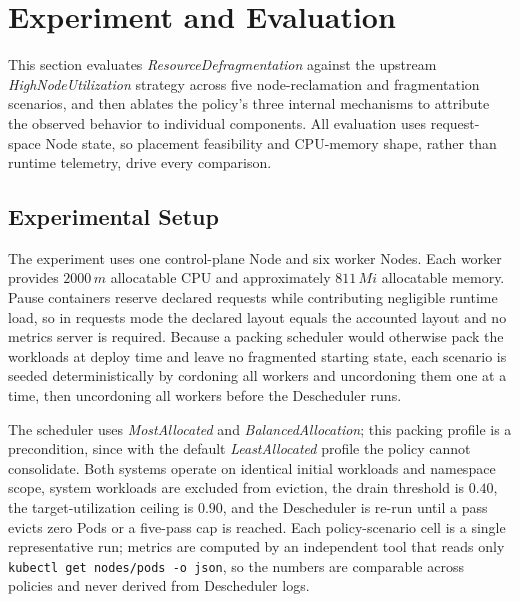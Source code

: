 \section{Experiment and Evaluation}
\label{bab:4}

This section evaluates \textit{ResourceDefragmentation} against the upstream \textit{HighNodeUtilization} strategy across five node-reclamation and fragmentation scenarios, and then ablates the policy's three internal mechanisms to attribute the observed behavior to individual components. All evaluation uses request-space Node state, so placement feasibility and CPU-memory shape, rather than runtime telemetry, drive every comparison.

\subsection{Experimental Setup}
\label{sec:defrag_experimental_setup}

The experiment uses one control-plane Node and six worker Nodes. Each worker provides \(2000\,m\) allocatable CPU and approximately \(811\,Mi\) allocatable memory. Pause containers reserve declared requests while contributing negligible runtime load, so in requests mode the declared layout equals the accounted layout and no metrics server is required. Because a packing scheduler would otherwise pack the workloads at deploy time and leave no fragmented starting state, each scenario is seeded deterministically by cordoning all workers and uncordoning them one at a time, then uncordoning all workers before the Descheduler runs.

The scheduler uses \textit{MostAllocated} and \textit{BalancedAllocation}; this packing profile is a precondition, since with the default \textit{LeastAllocated} profile the policy cannot consolidate. Both systems operate on identical initial workloads and namespace scope, system workloads are excluded from eviction, the drain threshold is \(0.40\), the target-utilization ceiling is \(0.90\), and the Descheduler is re-run until a pass evicts zero Pods or a five-pass cap is reached. Each policy-scenario cell is a single representative run; metrics are computed by an independent tool that reads only \texttt{kubectl get nodes/pods -o json}, so the numbers are comparable across policies and never derived from Descheduler logs.

